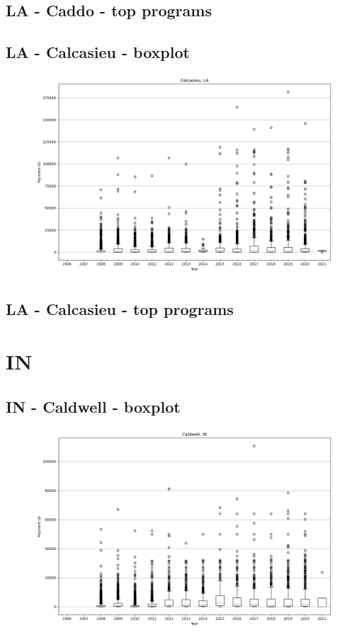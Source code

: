 \subsection*{LA - Caddo - top programs}

\newpage
\subsection*{LA - Calcasieu - boxplot}
\begin{figure}[h]
\centering
\includegraphics[width=7in]{../output/boxplots/counties/Calcasieu-LA_boxplot.png}
\end{figure}


\subsection*{LA - Calcasieu - top programs}

\newpage
\section*{IN}
\subsection*{IN - Caldwell - boxplot}
\begin{figure}[h]
\centering
\includegraphics[width=7in]{../output/boxplots/counties/Caldwell-IN_boxplot.png}
\end{figure}


